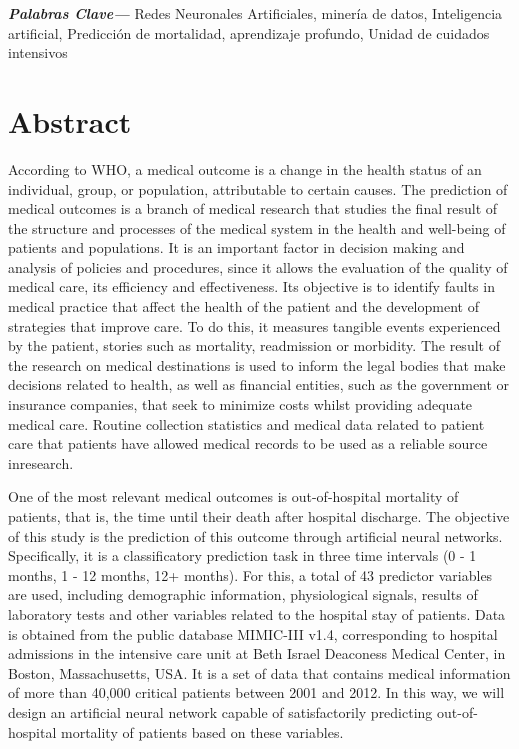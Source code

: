 \documentclass{report}
\providecommand{\keywords}[2]
{
  \small    
  \textbf{\textit{#2---}} #1 
}
\begin{document}
\keywords{Redes Neuronales Artificiales, minería de datos, Inteligencia artificial, Predicción de mortalidad, aprendizaje profundo, Unidad de cuidados intensivos}{Palabras Clave}

\chapter*{Abstract}
\vspace{-5mm}
According to WHO, a medical outcome is a change in the health status of an individual, group, or population, attributable to certain causes. The prediction of medical outcomes is a branch of medical research that studies the final result of the structure and processes of the medical system in the health and well-being of patients and populations. It is an important factor in decision making and analysis of policies and procedures, since it allows the evaluation of the quality of medical care, its efficiency and effectiveness. Its objective is to identify faults in medical practice that affect the health of the patient and the development of strategies that improve care. To do this, it measures tangible events experienced by the patient, stories such as mortality, readmission or morbidity. The result of the research on medical destinations is used to inform the legal bodies that make decisions related to health, as well as financial entities, such as the government or insurance companies, that seek to minimize costs whilst providing adequate medical care. Routine collection statistics and medical data related to patient care that patients have allowed medical records to be used as a reliable source inresearch.

One of the most relevant medical outcomes is out-of-hospital mortality of patients, that is, the time until their death after hospital discharge. The objective of this study is the prediction of this outcome through artificial neural networks. Specifically, it is a classificatory prediction task in three time intervals (0 - 1 months, 1 - 12 months, 12+ months). For this, a total of 43 predictor variables are used, including demographic information, physiological signals, results of laboratory tests and other variables related to the hospital stay of patients. Data is obtained from the public database MIMIC-III v1.4, corresponding to hospital admissions in the intensive care unit at Beth Israel Deaconess Medical Center, in Boston, Massachusetts, USA. It is a set of data that contains medical information of more than 40,000 critical patients between 2001 and 2012. In this way, we will design an artificial neural network capable of satisfactorily predicting out-of-hospital mortality of patients based on these variables.
\end{document}
